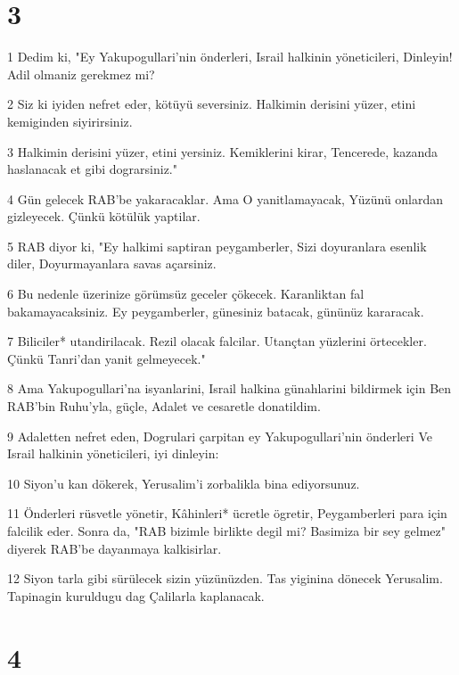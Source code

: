 \chapter{3}

\par 1 Dedim ki, "Ey Yakupogullari'nin önderleri, Israil halkinin yöneticileri, Dinleyin! Adil olmaniz gerekmez mi?
\par 2 Siz ki iyiden nefret eder, kötüyü seversiniz. Halkimin derisini yüzer, etini kemiginden siyirirsiniz.
\par 3 Halkimin derisini yüzer, etini yersiniz. Kemiklerini kirar, Tencerede, kazanda haslanacak et gibi dograrsiniz."
\par 4 Gün gelecek RAB'be yakaracaklar. Ama O yanitlamayacak, Yüzünü onlardan gizleyecek. Çünkü kötülük yaptilar.
\par 5 RAB diyor ki, "Ey halkimi saptiran peygamberler, Sizi doyuranlara esenlik diler, Doyurmayanlara savas açarsiniz.
\par 6 Bu nedenle üzerinize görümsüz geceler çökecek. Karanliktan fal bakamayacaksiniz. Ey peygamberler, günesiniz batacak, gününüz kararacak.
\par 7 Biliciler* utandirilacak. Rezil olacak falcilar. Utançtan yüzlerini örtecekler. Çünkü Tanri'dan yanit gelmeyecek."
\par 8 Ama Yakupogullari'na isyanlarini, Israil halkina günahlarini bildirmek için Ben RAB'bin Ruhu'yla, güçle, Adalet ve cesaretle donatildim.
\par 9 Adaletten nefret eden, Dogrulari çarpitan ey Yakupogullari'nin önderleri Ve Israil halkinin yöneticileri, iyi dinleyin:
\par 10 Siyon'u kan dökerek, Yerusalim'i zorbalikla bina ediyorsunuz.
\par 11 Önderleri rüsvetle yönetir, Kâhinleri* ücretle ögretir, Peygamberleri para için falcilik eder. Sonra da, "RAB bizimle birlikte degil mi? Basimiza bir sey gelmez" diyerek RAB'be dayanmaya kalkisirlar.
\par 12 Siyon tarla gibi sürülecek sizin yüzünüzden. Tas yiginina dönecek Yerusalim. Tapinagin kuruldugu dag Çalilarla kaplanacak.

\chapter{4}

